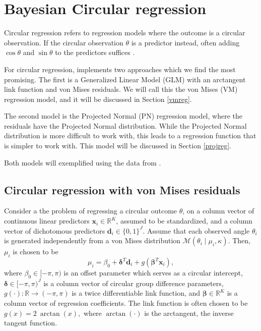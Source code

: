 \hypertarget{bayesian-circular-regression}{%
\section{Bayesian Circular
regression}\label{bayesian-circular-regression}}

\label{circreg}

Circular regression refers to regression models where the outcome is a
circular observation. If the circular observation \(\theta\) is a
predictor instead, often adding \(\cos\theta\) and \(\sin\theta\) to the
predictors suffices \citep{fisher1995statistical}.

For circular regression,  implements two approaches which
we find the most promising. The first is a Generalized Linear Model
(GLM) with an arctangent link function and von Mises residuals. We will
call this the von Mises (VM) regression model, and it will be discussed
in Section \ref{vmreg}.

The second model is the Projected Normal (PN) regression model, where
the residuals have the Projected Normal distribution. While the
Projected Normal distribution is more difficult to work with, this leads
to a regression function that is simpler to work with. This model will
be discussed in Section \ref{projreg}.

Both models will exemplified using the  data
\citep{puglisi2017role} from .

\hypertarget{circular-regression-with-von-mises-residuals}{%
\subsection{Circular regression with von Mises
residuals}\label{circular-regression-with-von-mises-residuals}}

\label{vmreg}

Consider a the problem of regressing a circular outcome \(\theta\), on a
column vector of continuous linear predictors
\(\boldsymbol{x}_i \in \mathbb{R}^K\), assumed to be standardized, and a
column vector of dichotomous predictors
\(\boldsymbol{d}_i \in \{0, 1\}^J\). Assume that each observed angle
\(\theta_i\) is generated independently from a von Mises distribution
\(\mathcal{M}(\theta_i \mid \mu_i, \kappa)\). Then, \(\mu_i\) is chosen
to be \begin{equation}
\mu_i = \beta_0 + \boldsymbol{\delta}^T \boldsymbol{d}_i + g(\boldsymbol{\beta}^T \boldsymbol{x}_i),
\end{equation} where \(\beta_0 \in [-\pi, \pi)\) is an offset parameter
which serves as a circular intercept,
\(\boldsymbol{\delta}\in [-\pi, \pi)^J\) is a column vector of circular
group difference parameters,
\(g(\cdot) : \mathbb{R} \rightarrow (-\pi, \pi)\) is a twice
differentiable link function, and \(\boldsymbol{\beta}\in \mathbb{R}^K\)
is a column vector of regression coefficients. The link function is
often chosen to be \(g(x) = 2 ~ \arctan(x),\) where \(\arctan(\cdot)\)
is the arctangent, the inverse tangent function.


